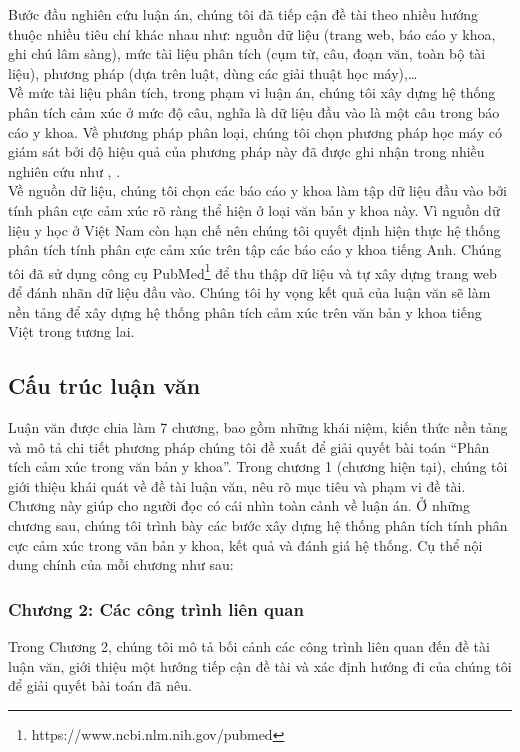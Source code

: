 Bước đầu nghiên cứu luận án, chúng tôi đã tiếp cận đề tài theo nhiều hướng thuộc nhiều tiêu chí khác nhau như: nguồn dữ liệu (trang web, báo cáo y khoa, ghi chú lâm sàng), mức tài liệu phân tích (cụm từ, câu, đoạn văn, toàn bộ tài liệu), phương pháp (dựa trên luật, dùng các giải thuật học máy),\ldots \\

Về mức tài liệu phân tích, trong phạm vi luận án, chúng tôi xây dựng hệ thống phân tích cảm xúc ở mức độ câu, nghĩa là dữ liệu đầu vào là một câu trong báo cáo y khoa. Về phương pháp phân loại, chúng tôi chọn phương pháp học máy có giám sát  bởi độ hiệu quả của phương pháp này đã được ghi nhận trong nhiều nghiên cứu như \cite{chandrakala2012opinion}, \cite{manning2009anintroduction}.\\

Về nguồn dữ liệu, chúng tôi chọn các báo cáo y khoa làm tập dữ liệu đầu vào bởi tính phân cực cảm xúc rõ ràng thể hiện ở loại văn bản y khoa này. Vì nguồn dữ liệu y học ở Việt Nam còn hạn chế nên chúng tôi quyết định hiện thực hệ thống phân tích tính phân cực cảm xúc trên tập các báo cáo y khoa tiếng Anh. Chúng tôi đã sử dụng công cụ PubMed\footnote{https://www.ncbi.nlm.nih.gov/pubmed} để thu thập dữ liệu và tự xây dựng trang web để đánh nhãn dữ liệu đầu vào. Chúng tôi hy vọng kết quả của luận văn sẽ làm nền tảng để xây dựng hệ thống phân tích cảm xúc trên văn bản y khoa tiếng Việt trong tương lai.\\
 

\subsection{Cấu trúc luận văn}
Luận văn được chia làm 7 chương, bao gồm những khái niệm, kiến thức nền tảng và mô tả chi tiết phương pháp chúng tôi đề xuất để giải quyết bài toán ``Phân tích cảm xúc trong văn bản y khoa''. Trong chương 1 (chương hiện tại), chúng tôi giới thiệu khái quát về đề tài luận văn, nêu rõ mục tiêu và phạm vi đề tài. Chương này giúp cho người đọc có cái nhìn toàn cảnh về luận án. Ở những chương sau, chúng tôi trình bày các bước xây dựng hệ thống phân tích tính phân cực cảm xúc trong văn bản y khoa, kết quả và đánh giá hệ thống. Cụ thể nội dung chính của mỗi chương như sau:

\subsubsection*{Chương 2: Các công trình liên quan}
Trong Chương 2, chúng tôi mô tả bối cảnh các công trình liên quan đến đề tài luận văn, giới thiệu một hướng tiếp cận đề tài và xác định hướng đi của chúng tôi để giải quyết bài toán đã nêu.
